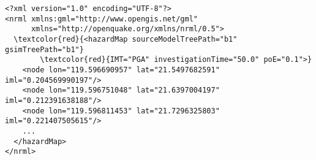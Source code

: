 \begin{Verbatim}[frame=single, commandchars=\\\{\}, fontsize=\small]
<?xml version="1.0" encoding="UTF-8"?>
<nrml xmlns:gml="http://www.opengis.net/gml"
      xmlns="http://openquake.org/xmlns/nrml/0.5">
  \textcolor{red}{<hazardMap sourceModelTreePath="b1" gsimTreePath="b1"}
        \textcolor{red}{IMT="PGA" investigationTime="50.0" poE="0.1">}
    <node lon="119.596690957" lat="21.5497682591" iml="0.204569990197"/>
    <node lon="119.596751048" lat="21.6397004197" iml="0.212391638188"/>
    <node lon="119.596811453" lat="21.7296325803" iml="0.221407505615"/>
    ...
  </hazardMap>
</nrml>
\end{Verbatim}